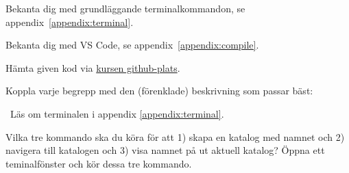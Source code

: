 

\ifPreSolution

\Exercise{\ExeWeekTWO}\label{exe:W02}
\begin{Goals}

\end{Goals}

\begin{Preparations}
\item {}
\item Bekanta dig med grundläggande terminalkommandon, se appendix~\ref{appendix:terminal}.
\item Bekanta dig med VS Code, se appendix~\ref{appendix:compile}.
\item Hämta given kod via \href{https://github.com/lunduniversity/introprog/tree/master/workspace/}{kursen github-plats}.

\end{Preparations}

\else

\ExerciseSolution{\ExeWeekTWO}

\fi

\BasicTasksNoLab %


\QUESTBEGIN

\Task \what

\vspace{1em}\noindent Koppla varje begrepp med den (förenklade) beskrivning som passar bäst:

\begin{ConceptConnections}

\end{ConceptConnections}

\SOLUTION

\TaskSolved \what

\begin{ConceptConnections}

\end{ConceptConnections}

\QUESTEND






\QUESTBEGIN

\Task \what~Läs om terminalen i appendix \ref{appendix:terminal}.

\Subtask Vilka tre kommando ska du köra för att 1) skapa en katalog med namnet  och 2)  navigera till katalogen och 3) visa namnet på ut aktuell katalog? Öppna ett teminalfönster och kör dessa tre kommando.

